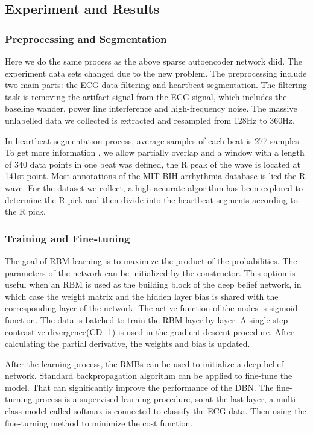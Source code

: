 \documentclass[graybox]{svmult}
\begin{document}
\subsection{Experiment  and Results}
\subsubsection{Preprocessing and Segmentation}
Here we do the same process as the above sparse autoencoder network diid. The experiment data sets changed due to the new problem. The preprocessing include two main parts: the ECG data filtering and heartbeat segmentation. The filtering task is removing the artifact signal from the ECG signal, which includes the baseline wander, power line interference and high-frequency noise. The  massive unlabelled data we collected is extracted and resampled from 128Hz to 360Hz. 

In heartbeat segmentation process, average samples of each beat is 277 samples. To get more information , we allow partially overlap and a window with a length of 340 data points in one beat was defined, the R peak of the wave is located at 141st point. Most annotations of the MIT-BIH arrhythmia database is lied the R-wave. For the dataset we collect, a high accurate algorithm has been explored to determine the R pick and then divide into the heartbeat segments according to the R pick.

\subsubsection{Training and Fine-tuning}
The goal of RBM learning is to maximize the product of the probabilities. The parameters of the network can be initialized by the constructor. This option is useful when an RBM is used as the building block of the deep belief network, in which case the weight matrix and the hidden layer bias is shared with the corresponding layer of the network. The active function of the nodes is sigmoid function. The data is batched to train the RBM layer by layer. A single-step contrastive divergence(CD- 1) is used in the gradient descent procedure. After calculating the partial derivative, the weights and bias is updated.

After the learning process, the RMBs can be used to initialize a deep belief network. Standard backpropagation algorithm can be applied to fine-tune the model. That can significantly improve the performance of the DBN. The fine- turning process is a supervised learning procedure, so at the last layer, a multi-class model called softmax is connected to classify the ECG data. Then using the fine-turning method to minimize the cost function.
\end{document}
